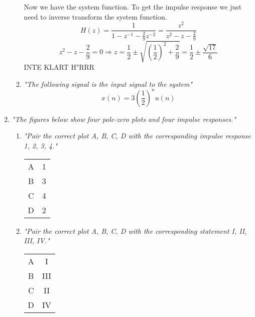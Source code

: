 \documentclass{article}
\begin{document}
\begin{enumerate}
\begin{enumerate}
                Now we have the system function. To get the impulse response we just need to inverse transform the system function.
                $$
                    H(z) = \frac{1}{1 - z^{-1} - \frac{2}{9}z^{-2}} = 
                    \frac{z^2}{z^2 - z - \frac{2}{9}}
                $$
                $$
                    z^2 - z - \frac{2}{9} = 0 \Rightarrow 
                    z = \frac{1}{2} \pm \sqrt{(\frac{1}{2})^2 + \frac{2}{9}} = 
                    \frac{1}{2} \pm \frac{\sqrt{17}}{6}
                $$
                INTE KLART H"RRR
                
            \item %
                \emph{"The following signal is the input signal to the system"}
                $$
                    x(n) = 3(\frac{1}{2})^nu(n)
                $$
        \end{enumerate}
    \item %
        \emph{"The figures below show four pole-zero plots and four impulse responses."}
        \begin{enumerate}
            \item %
                \emph{"Pair the correct plot A, B, C, D with the corresponding impulse response 1, 2, 3, 4."}
                \\
                \begin{center}
                    \begin{tabular}{c|c}
                        A & 1 \\
                        B & 3 \\
                        C & 4 \\
                        D & 2 \\
                    \end{tabular}
                \end{center}
            \item %
                \emph{"Pair the correct plot A, B, C, D with the corresponding statement I, II, III, IV."}
                \\
                \begin{center}
                    \begin{tabular}{c|c}
                        A & I \\
                        B & III \\
                        C & II \\
                        D & IV \\
                    \end{tabular}
                \end{center}
                
                
        \end{enumerate} %
        
\end{enumerate} %
\end{document}
